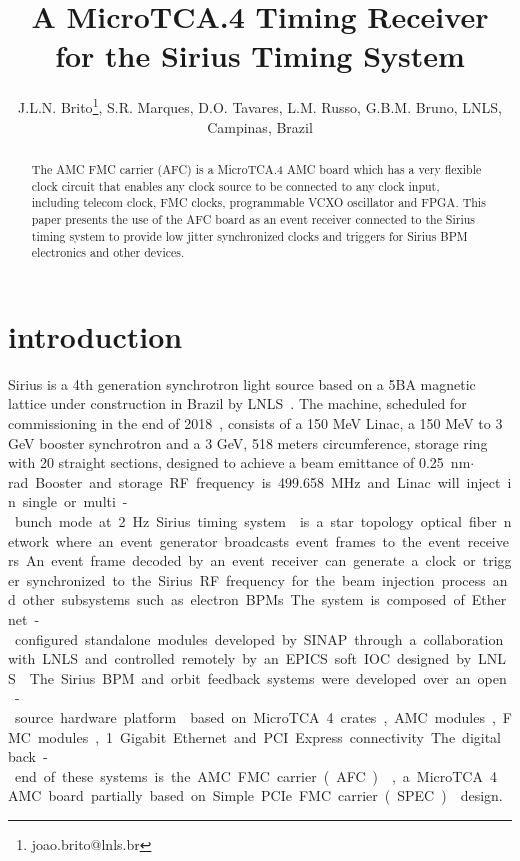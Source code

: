 \documentclass[a4paper,
               biblatex,      %
               ]{jacow}
\begin{document}
\title{A MicroTCA.4  Timing Receiver for the Sirius Timing System}

\author{J.L.N. Brito\thanks{joao.brito@lnls.br}, S.R. Marques, D.O. Tavares, L.M. Russo, G.B.M. Bruno, LNLS, Campinas, Brazil}
	
\maketitle


\begin{abstract}
   The AMC FMC carrier (AFC) is a MicroTCA.4 AMC board which has a very flexible clock circuit that enables any clock source to be connected to any clock input, including telecom clock, FMC clocks, programmable VCXO oscillator and FPGA. This paper presents the use of the AFC board as an event receiver connected to the Sirius timing system to provide low jitter synchronized clocks and triggers for Sirius BPM electronics and other devices.
\end{abstract}


\section{introduction}
Sirius is a 4th  generation  synchrotron light source  based  on  a 5BA magnetic lattice under construction in Brazil by LNLS~\cite{sirius_ipac16}. The machine, scheduled for commissioning in the end of 2018~\cite{rodrigues2016sirius}, consists of a 150 MeV Linac, a 150 MeV to 3 GeV booster synchrotron and a 3 GeV, 518 meters circumference, storage ring with 20 straight sections, designed to achieve a beam emittance of \SI{0.25}{nm$\cdot$rad}. Booster and storage RF frequency is \SI{499.658}{MHz} and Linac will inject in single or multi-bunch mode at \SI{2}{Hz}.

Sirius timing system~\cite{timing_icalepcs15} is a star topology optical fiber network where an event generator broadcasts event frames to the event receivers. An event frame decoded by an event receiver can generate a clock or trigger synchronized to the Sirius RF frequency for the beam injection process and other subsystems such as electron BPMs. The system is composed of Ethernet-configured standalone modules developed by SINAP through a collaboration with LNLS and controlled remotely by an EPICS soft IOC designed by LNLS~\cite{sinap-timing-epics-ioc}.

The Sirius BPM and orbit feedback systems were developed over an open-source hardware platform~\cite{ebpm_icalepcs13} based on MicroTCA.4 crates, AMC modules, FMC modules, 1 Gigabit Ethernet and PCI Express connectivity. The digital back-end of these systems is the AMC FMC carrier (AFC)~\cite{afc-git}, a MicroTCA.4 AMC board partially based on Simple PCIe FMC carrier (SPEC)~\cite{spec} design. 
\end{document}
